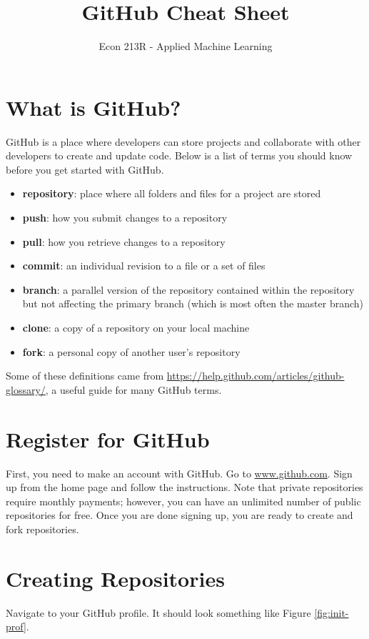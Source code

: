 \documentclass[11pt,a4paper]{article}
\title{GitHub Cheat Sheet}
\date{}
\author{Econ 213R - Applied Machine Learning}
\begin{document}
\vspace*{-75pt}
    {\let\newpage\relax\maketitle}
    
\section*{What is GitHub?}
GitHub is a place where developers can store projects and collaborate with other developers to create and update code.
Below is a list of terms you should know before you get started with GitHub.

\begin{itemize}
\item \textbf{repository}: place where all folders and files for a project are stored
\item \textbf{push}: how you submit changes to a repository
\item \textbf{pull}: how you retrieve changes to a repository
\item \textbf{commit}: an individual revision to a file or a set of files
\item \textbf{branch}: a parallel version of the repository contained within the repository but not affecting the primary branch (which is most often the master branch)
\item \textbf{clone}: a copy of a repository on your local machine
\item \textbf{fork}: a personal copy of another user's repository
\end{itemize}

Some of these definitions came from \url{https://help.github.com/articles/github-glossary/}, a useful guide for many GitHub terms.
    
\section*{Register for GitHub}
First, you need to make an account with GitHub.
Go to \url{www.github.com}. 
Sign up from the home page and follow the instructions.
Note that private repositories require monthly payments; however, you can have an unlimited number of public repositories for free.
Once you are done signing up, you are ready to create and fork repositories.

\section*{Creating Repositories}
Navigate to your GitHub profile.
It should look something like Figure \ref{fig:init-prof}.
\end{document}
